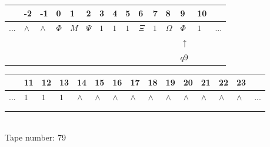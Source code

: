 \documentclass[11pt]{article}
\begin{document}
\begin{table}[H]
\centering
\begin{tabular}{lllllllllllllll}
 & -2 & -1 & 0 & 1 & 2 & 3 & 4 & 5 & 6 & 7 & 8 & 9 & 10 & \\
\hline
$...$ & \multicolumn{1}{|l|}{$\wedge$} & \multicolumn{1}{|l|}{$\wedge$} & \multicolumn{1}{|l|}{$\Phi$} & \multicolumn{1}{|l|}{$M$} & \multicolumn{1}{|l|}{$\Psi$} & \multicolumn{1}{|l|}{$1$} & \multicolumn{1}{|l|}{$1$} & \multicolumn{1}{|l|}{$1$} & \multicolumn{1}{|l|}{$\Xi$} & \multicolumn{1}{|l|}{$1$} & \multicolumn{1}{|l|}{$\Omega$} & \multicolumn{1}{|l|}{$\Phi$} & \multicolumn{1}{|l|}{$1$} & $...$\\
\hline
&  &  &  &  &  &  &  &  &  &  &  & $\uparrow$ &  &  \\
&  &  &  &  &  &  &  &  &  &  &  & $ q9 $ &  &  \\
\end{tabular}
\begin{tabular}{lllllllllllllll}
 & 11 & 12 & 13 & 14 & 15 & 16 & 17 & 18 & 19 & 20 & 21 & 22 & 23 & \\
\hline
$...$ & \multicolumn{1}{|l|}{$1$} & \multicolumn{1}{|l|}{$1$} & \multicolumn{1}{|l|}{$1$} & \multicolumn{1}{|l|}{$\wedge$} & \multicolumn{1}{|l|}{$\wedge$} & \multicolumn{1}{|l|}{$\wedge$} & \multicolumn{1}{|l|}{$\wedge$} & \multicolumn{1}{|l|}{$\wedge$} & \multicolumn{1}{|l|}{$\wedge$} & \multicolumn{1}{|l|}{$\wedge$} & \multicolumn{1}{|l|}{$\wedge$} & \multicolumn{1}{|l|}{$\wedge$} & \multicolumn{1}{|l|}{$\wedge$} & $...$\\
\hline
&  &  &  &  &  &  &  &  &  &  &  &  &  &  \\
&  &  &  &  &  &  &  &  &  &  &  &  &  &  \\
\end{tabular}
\\
Tape number: 79
\noindent\makebox[\linewidth]{\hdashrule{\textwidth}{1pt}{1pt}}\end{table}
\clearpage
\end{document}
